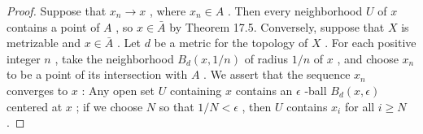 \begin{proof}
Suppose that \({x}_{n} \rightarrow  x\) , where \({x}_{n} \in  A\) . Then every neighborhood \(U\) of \(x\) contains a point of \(A\) , so \(x \in  \bar{A}\) by Theorem 17.5. Conversely, suppose that \(X\) is metrizable and \(x \in  \bar{A}\) . Let \(d\) be a metric for the topology of \(X\) . For each positive integer \(n\) , take the neighborhood \({B}_{d}\left( {x,1/n}\right)\) of radius \(1/n\) of \(x\) , and choose \({x}_{n}\) to be a point of its intersection with \(A\) . We assert that the sequence \({x}_{n}\) converges to \(x\) : Any open set \(U\) containing \(x\) contains an \(\epsilon\) -ball \({B}_{d}\left( {x,\epsilon }\right)\) centered at \(x\) ; if we choose \(N\) so that \(1/N < \epsilon\) , then \(U\) contains \({x}_{i}\) for all \(i \geq  N\) .
\end{proof}

